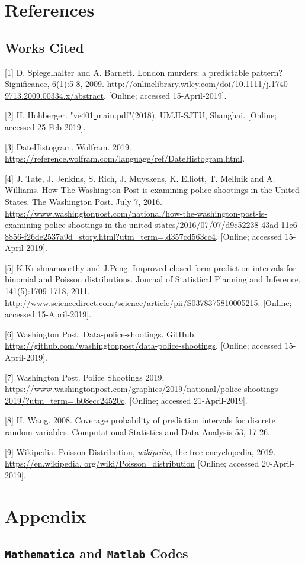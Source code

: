 \documentclass[a4paper]{article}
\begin{document}
\newpage

\section{References}
\subsection{Works Cited}
[1] D. Spiegelhalter and A. Barnett. London murders: a predictable pattern? Significance, 6(1):5-8, 2009. \url{http://onlinelibrary.wiley.com/doi/10.1111/j.1740-9713.2009.00334.x/abstract}. [Online; accessed 15-April-2019].

[2] H. Hohberger. "ve401\uline{ }main.pdf"(2018). UMJI-SJTU, Shanghai. [Online; accessed 25-Feb-2019]. 

[3] DateHistogram. Wolfram. 2019. \url{https://reference.wolfram.com/language/ref/DateHistogram.html}.

[4] J. Tate, J. Jenkins, S. Rich, J. Muyskens, K. Elliott, T. Mellnik and A. Williams. How The Washington Post is examining police shootings in the United States. The Washington Post. July 7, 2016. \url{https://www.washingtonpost.com/national/how-the-washington-post-is-examining-police-shootings-in-the-united-states/2016/07/07/d9c52238-43ad-11e6-8856-f26de2537a9d_story.html?utm_term=.d357cd563cc4}. [Online; accessed 15-April-2019].

[5] K.Krishnamoorthy and J.Peng. Improved closed-form prediction intervals for binomial and Poisson distributions. Journal of Statistical Planning and Inference, 141(5):1709-1718, 2011. \url{http://www.sciencedirect.com/science/article/pii/S0378375810005215}. [Online; accessed 15-April-2019].

[6] Washington Post. Data-police-shootings. GitHub. \url{https://github.com/washingtonpost/data-police-shootings}. [Online; accessed 15-April-2019].

[7] Washington Post. Police Shootings 2019. \url{https://www.washingtonpost.com/graphics/2019/national/police-shootings-2019/?utm_term=.b08ecc24520c}. [Online; accessed 21-April-2019].

[8] H. Wang. 2008. Coverage probability of prediction intervals for discrete random variables. Computational Statistics and Data Analysis 53, 17-26.

[9] Wikipedia. Poisson Distribution, \textit{wikipedia}, the free encyclopedia, 2019. \url{https://en.wikipedia. org/wiki/Poisson_distribution} [Online; accessed 20-April-2019]. 
\section{Appendix}
\subsection{\texttt{Mathematica} and \texttt{Matlab} Codes}
\end{document}
